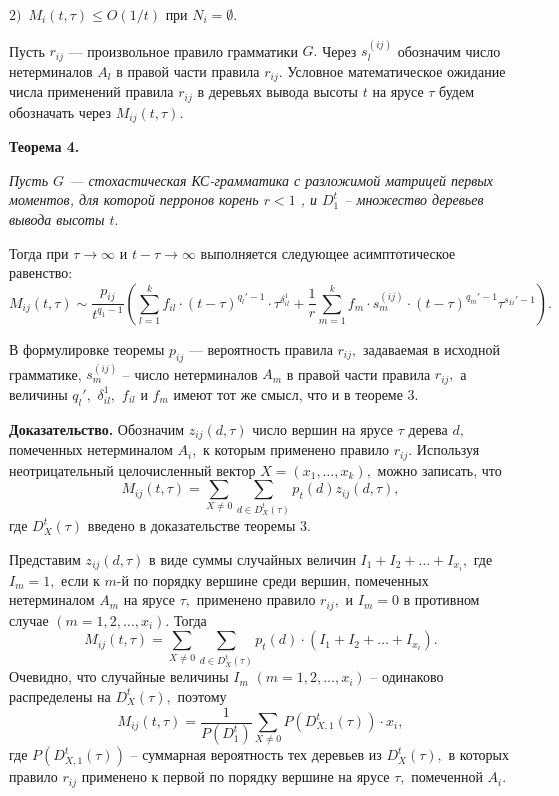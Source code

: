 \documentclass[%
11pt,a4paper]{article}
\begin{document}
{{{{$2)\,\,\, M_i(t,\tau)\le O(1/t)$ при $N_i = \emptyset$.

}

\medskip

Пусть $r_{ij}$ --- произвольное правило грамматики $G.$
Через $s_l^{(ij)}$ обозначим число нетерминалов $A_l$
в правой части правила $r_{ij}.$
Условное математическое ожидание числа применений правила $r_{ij}$
в деревьях вывода высоты $t$ на ярусе $\tau$ будем обозначать через
$M_{ij}(t,\tau).$

\medskip

\textbf {Теорема 4.}
{\em Пусть $G$ --- стохастическая КС-грамматика с разложимой
матрицей первых моментов, для которой перронов корень $r<1$ , и $D^t_1$ -- множество деревьев вывода
высоты $t.$

Тогда при $\tau \rightarrow \infty $ и $t-\tau \rightarrow \infty $
выполняется следующее асимптотическое равенство:
$$
M_{ij}(t,\tau)\sim \frac{p_{ij}}{t^{q_1-1}} \left(\sum_{l =1}^k f_{il} \cdot (t-\tau)^{q_l'-1}\cdot \tau^{\delta_{il}^1}+
\frac{1}{{r }} \sum_{m=1}^k f_m\cdot s_m^{(ij)}\cdot
 (t-\tau)^{q_m'-1}\tau^{s_{1i}'-1}\right).
$$
}
В формулировке теоремы $p_{ij}$ --- вероятность правила $r_{ij},$ задаваемая в исходной грамматике,
$s_m^{(ij)}$ -- число нетерминалов $A_m$ в правой части правила $r_{ij},$
а величины $q_l',$ $\delta_{il}^1,$ $f_{il}$ и $f_m$
имеют тот же смысл, что и в теореме 3.

\medskip

\textbf {Доказательство.} \nopagebreak
Обозначим $z_{ij}(d,\tau)$ число вершин на ярусе $\tau$ дерева $d,$
помеченных нетерминалом $A_i,$ к которым применено правило $r_{ij}.$
Используя неотрицательный целочисленный вектор $X=(x_1,\ldots,x_k),$ можно записать, что
$$
M_{ij}(t,\tau)= \sum_{X \ne 0}
\sum_{d \in D_X^t(\tau)} p_t(d) z_{ij}(d,\tau),
$$
где $D_X^t(\tau)$ введено в доказательстве теоремы 3.

Представим $z_{ij}(d,\tau)$ в виде суммы случайных величин
$I_1+I_2+ \ldots+I_{x_i},$
где $I_m=1,$ если к $m$-й по порядку вершине среди вершин,
помеченных нетерминалом $A_m$ на ярусе $\tau,$
применено правило $r_{ij},$ и $I_m=0$ в противном случае
$(m=1,2, \ldots, x_i).$
Тогда
$$
M_{ij}(t,\tau)= \sum_{X \ne 0}
\sum_{d \in D_X^t(\tau)} p_t(d)\cdot (I_1+I_2+\ldots +I_{x_i}).
$$
Очевидно, что случайные величины $I_m$ $(m=1,2, \ldots, x_i)$ --
одинаково распределены на $D_X^t(\tau),$ поэтому
$$
M_{ij}(t,\tau)=\frac{1}{P(D^t_1)}\sum_{X \ne 0}
P\left(D_{X,1}^t(\tau)\right) \cdot x_i,
$$
где $P(D_{X,1}^t(\tau))$ -- суммарная вероятность тех деревьев
из $D_X^t(\tau),$ в которых правило $r_{ij}$ применено к первой по порядку
вершине на ярусе $\tau,$ помеченной $A_i.$

}}}
\end{document}
